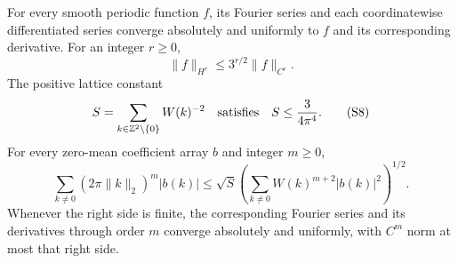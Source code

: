 \begin{lemma}
\label{lem:ns-fourier-analytic-bridge}
For every smooth periodic function $f$, its Fourier series and each
coordinatewise differentiated series converge absolutely and uniformly
to $f$ and its corresponding derivative. For an integer $r\geq0$,
\[
 \|f\|_{H^r}\leq3^{r/2}\|f\|_{C^r}.                \tag{S7}
\]
The positive lattice constant
\[
 S=\sum_{k\in\mathbb Z^2\setminus\{0\}}W(k)^{-2}
       \quad\hbox{satisfies}\quad S\leq\frac3{4\pi^4}.            \tag{S8}
\]
For every zero-mean coefficient array $b$ and integer $m\geq0$,
\[
 \sum_{k\ne0}(2\pi\|k\|_2)^m|b(k)|
    \leq\sqrt S\left(\sum_{k\ne0}W(k)^{m+2}|b(k)|^2\right)^{1/2}.
                                                               \tag{S9}
\]
Whenever the right side is finite, the corresponding Fourier series
and its derivatives through order $m$ converge absolutely and
uniformly, with $C^m$ norm at most that right side.
\end{lemma}
